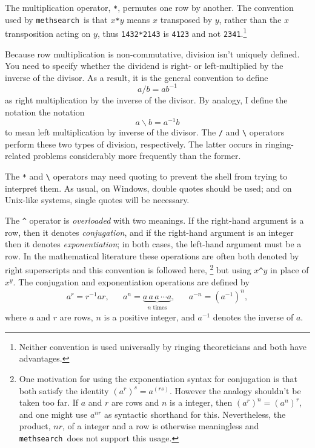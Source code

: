 \documentclass[a4paper,11pt,oneside]{book}
\def\textitidx#1{\textit{#1}\index{#1}}
\def\methsearch{\texttt{meth\-search}}
\begin{document}
The multiplication operator, \verb+*+, 
permutes one row by another.  The convention used by 
\methsearch\ is that $x$\verb+*+$y$ means $x$ transposed by $y$, rather
than the $x$ transposition acting on $y$, thus \verb+1432*2143+ is 
\verb+4123+ and not \verb+2341+.\footnote{Neither convention is used 
universally by ringing theoreticians and both have advantages.}

Because row multiplication is non-commutative, 
division isn't uniquely defined.  
You need to specify whether the dividend is right- or
left-multiplied by the inverse of the divisor.  As a result, it is the
general convention to define
\[ a/b = a b^{-1} \]
as right multiplication by the inverse of the divisor.  By analogy, I 
define the notation the notation
\[  a\backslash b = a^{-1} b \]
to mean left multiplication by inverse of the divisor.  The \verb+/+ and
\verb+\+ operators perform these two types of division, respectively.
The latter occurs in ringing-related problems considerably more frequently 
than the former.

The \verb+*+ and \verb+\+ operators may need quoting
to prevent the shell from trying to interpret them.  As usual, on Windows, 
double quotes should be used; and on Unix-like systems, single quotes will 
be necessary.

The \verb+^+ operator is \textit{overloaded} 
with two meanings.  If the right-hand argument is a row, 
then it denotes \textitidx{conjugation}, and if the right-hand
argument is an integer then it denotes \textitidx{exponentiation};
in both cases, the left-hand argument must be a row.  In the mathematical
literature these operations are often both denoted by right superscripts
and this convention is followed here,%
\footnote{One motivation for using the exponentiation syntax for conjugation
is that both satisfy the identity $(a^r)^s =  a^{(rs)}$.  However the analogy 
shouldn't be taken too far.  If $a$ and $r$ are rows and $n$ is a integer,
then $(a^r)^n = (a^n)^r$, and one might use $a^{nr}$ as syntactic shorthand 
for this.  Nevertheless, the product, $nr$, of a integer and a row is 
otherwise meaningless and \methsearch\ does not support this usage.}
but using $x$\verb+^+$y$ in place of $x^y$.
The conjugation and exponentiation operations are defined by
\begin{align*}
a^r = r^{-1} a r, && 
a^n = \underbrace{a\,a\,a\,\dotsm a}_{\text{$n$ times}}, &&
a^{-n} = (a^{-1})^n,
\end{align*}
where $a$ and $r$ are rows, $n$ is a positive integer, and
$a^{-1}$ denotes the inverse of $a$.
\end{document}
